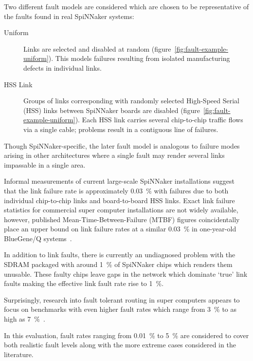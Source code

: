 			Two different fault models are considered which are chosen to be
			representative of the faults found in real SpiNNaker systems:
			
			\begin{description}
				
				\item[Uniform] Links are selected and disabled at random
				(figure~\ref{fig:fault-example-uniform}). This models failures
				resulting from isolated manufacturing defects in individual links.
				
				\item[HSS Link] Groups of links corresponding with randomly selected
				High-Speed Serial (HSS) links between SpiNNaker boards are disabled
				(figure~\ref{fig:fault-example-uniform}). Each HSS link carries several
				chip-to-chip traffic flows via a single cable; problems result in a
				contiguous line of failures.
				
			\end{description}
			
			Though SpiNNaker-specific, the later fault model is analogous to failure
			modes arising in other architectures where a single fault may render
			several links impassable in a single area.
			
			Informal measurements of current large-scale SpiNNaker installations
			suggest that the link failure rate is approximately \SI{0.03}{\percent}
			with failures due to both individual chip-to-chip links and
			board-to-board HSS links. Exact link failure statistics for commercial
			super computer installations are not widely available, however, published
			Mean-Time-Between-Failure (MTBF) figures coincidentally place an upper
			bound on link failure rates at a similar \SI{0.03}{\percent} in
			one-year-old BlueGene/Q systems~\cite{chiu11}.
			
			In addition to link faults, there is currently an undiagnosed problem
			with the SDRAM packaged with around \SI{1}{\percent} of SpiNNaker chips
			which renders them unusable. These faulty chips leave gaps in the network
			which dominate `true' link faults making the effective link fault rate
			rise to \SI{1}{\percent}.
			
			Surprisingly, research into fault tolerant routing in super computers
			appears to focus on benchmarks with even higher fault rates which range
			from \SI{3}{\percent} to as high as
			\SI{7}{\percent}~\cite{ho04,gomez04,mejia06}.
			
			In this evaluation, fault rates ranging from \SI{0.01}{\percent} to
			\SI{5}{\percent} are considered to cover both realistic fault levels
			along with the more extreme cases considered in the literature.
		
